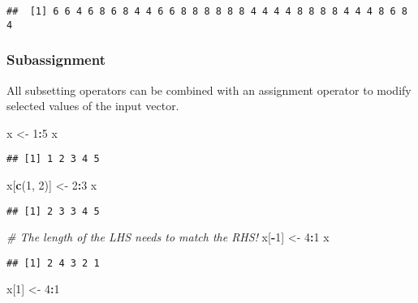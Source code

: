 \documentclass[
]{book}
\newenvironment{Shaded}{\begin{snugshade}}{\end{snugshade}}
\newcommand{\CommentTok}[1]{\textcolor[rgb]{0.56,0.35,0.01}{\textit{#1}}}
\newcommand{\DecValTok}[1]{\textcolor[rgb]{0.00,0.00,0.81}{#1}}
\newcommand{\KeywordTok}[1]{\textcolor[rgb]{0.13,0.29,0.53}{\textbf{#1}}}
\newcommand{\NormalTok}[1]{#1}
\newcommand{\OperatorTok}[1]{\textcolor[rgb]{0.81,0.36,0.00}{\textbf{#1}}}
\newcommand{\StringTok}[1]{\textcolor[rgb]{0.31,0.60,0.02}{#1}}
\begin{document}
\begin{verbatim}
##  [1] 6 6 4 6 8 6 8 4 4 6 6 8 8 8 8 8 8 4 4 4 4 8 8 8 8 4 4 4 8 6 8 4
\end{verbatim}

\hypertarget{subassignment}{%
\subsubsection{Subassignment}\label{subassignment}}

All subsetting operators can be combined with an assignment operator to modify selected values of the input vector.

\begin{Shaded}
\begin{Highlighting}[]
\NormalTok{x \textless{}{-}}\StringTok{ }\DecValTok{1}\OperatorTok{:}\DecValTok{5}
\NormalTok{x}
\end{Highlighting}
\end{Shaded}

\begin{verbatim}
## [1] 1 2 3 4 5
\end{verbatim}

\begin{Shaded}
\begin{Highlighting}[]
\NormalTok{x[}\KeywordTok{c}\NormalTok{(}\DecValTok{1}\NormalTok{, }\DecValTok{2}\NormalTok{)] \textless{}{-}}\StringTok{ }\DecValTok{2}\OperatorTok{:}\DecValTok{3}
\NormalTok{x}
\end{Highlighting}
\end{Shaded}

\begin{verbatim}
## [1] 2 3 3 4 5
\end{verbatim}

\begin{Shaded}
\begin{Highlighting}[]
\CommentTok{\# The length of the LHS needs to match the RHS!}
\NormalTok{x[}\OperatorTok{{-}}\DecValTok{1}\NormalTok{] \textless{}{-}}\StringTok{ }\DecValTok{4}\OperatorTok{:}\DecValTok{1}
\NormalTok{x}
\end{Highlighting}
\end{Shaded}

\begin{verbatim}
## [1] 2 4 3 2 1
\end{verbatim}

\begin{Shaded}
\begin{Highlighting}[]
\NormalTok{x[}\DecValTok{1}\NormalTok{] \textless{}{-}}\StringTok{ }\DecValTok{4}\OperatorTok{:}\DecValTok{1}
\end{Highlighting}
\end{Shaded}
\end{document}
